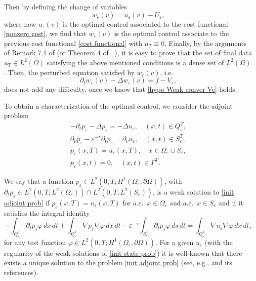 \documentclass[reqno]{amsart}
\begin{document}
\begin{remark}
\[\]
Then by defining the change of variables
\[
w{_{\varepsilon }(v)=u_{\varepsilon }(v)-}U_{\varepsilon },
\]
where now ${u_{\varepsilon }(v)}$ is the optimal control associated to the
cost functional \eqref{nonzero cost}, we find that $w{_{\varepsilon }(v)}$
is the optimal control associate to the previous cost functional \eqref{cost
functional} with $u_{T}\equiv 0$. Finally, by the arguments of Remark 7.1
of \cite{DiPoShAttouch} (or Theorem 4 of \  \cite{DiPoShRACSAM}), it is easy
to prove that the set of final data $u_{T}\in L^2(\Omega )$ satisfying the
above mentioned conditions is a dense set of $L^2(\Omega )$. Then, the
perturbed equation satisfied by $w{_{\varepsilon }(v)}$, i.e.
\[
\partial _{t}w{_{\varepsilon }(v)}-\Delta w{_{\varepsilon }(v)}
=f-V_{\varepsilon },
\]
does not add any difficulty, once we know that \eqref{hypo Weak conver Ve}
holds.
\end{remark}

To obtain a characterization of the optimal control, we consider the
adjoint problem
\begin{equation}
\begin{gathered}
-\partial _{t}p_{\varepsilon }-\Delta p_{\varepsilon }=-\Delta
u_{\varepsilon }, \quad (x,t)\in Q_{\varepsilon }^{T}, \\
\partial _{\nu }p_{\varepsilon }-\varepsilon ^{-\gamma }\partial
_{t}p_{\varepsilon }=\partial _{\nu }u_{\varepsilon }, \quad (x,t)\in
S_{\varepsilon }^{T}, \\
p_{\varepsilon }(x,T)=u_{\varepsilon }(x,T), \quad x\in \Omega _{\varepsilon
}\cup S_{\varepsilon }, \\
p_{\varepsilon }(x,t)=0, \quad (x,t)\in \Gamma ^{T}.
\end{gathered} \label{init adjoint prob}
\end{equation}

We say that a function $p_{\varepsilon }\in L^2(0,T;H^{1}(\Omega
_{\varepsilon },\partial \Omega ))$, with 
$\partial _{t}p_{\varepsilon }\in
L^2(0,T;L^2(\Omega _{\varepsilon }))\cap L^2(0,T;L^2(S_{\varepsilon}))$, 
is a weak solution to  \eqref{init adjoint prob} if 
$p_{\varepsilon }(x,T)=u_{\varepsilon }(x,T)$ for a.e.\
 $x\in \Omega_{\varepsilon }$ and a.e.\ $x\in S_{\varepsilon }$ and if it satisfies the
integral identity
\begin{equation}
-\int _{Q_{\varepsilon }^{T}}\partial _{t}p_{\varepsilon }\varphi \,dx\,dt
+\int _{Q_{\varepsilon }^{T}}\nabla p_{\varepsilon }\nabla
\varphi \,dx\,dt-\varepsilon ^{-\gamma }\int _{S_{\varepsilon
}^{T}}\partial _{t}p_{\varepsilon }\varphi \,ds\,dt
=\int_{Q_{\varepsilon }^{T}}\nabla u_{\varepsilon }\nabla \varphi \,dx\,dt,
\label{int ident init adjoint prob}
\end{equation}
for any test function $\varphi \in L^2(0,T;H^{1}(\Omega _{\varepsilon
},\partial \Omega ))$. 
For a given $u_{\varepsilon }$ (with the regularity
of the weak solutions of \eqref{init state prob}) it is well-known that
there exists a unique solution to the problem \eqref{init adjoint prob}
(see, e.g., \cite{BejeDVrabie} and its references).
\end{document}
